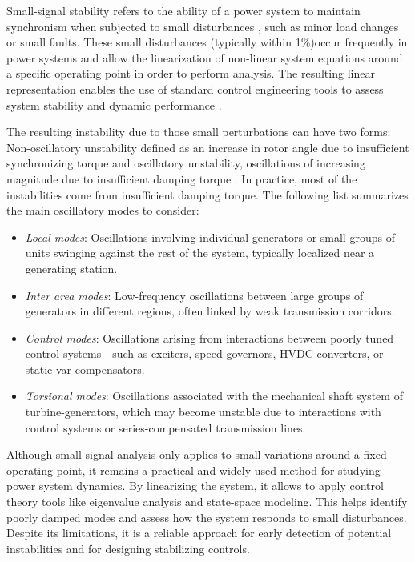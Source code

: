 Small-signal stability refers to the ability of a power system to maintain synchronism when subjected to 
small disturbances \cite{StabilityAndControlKundur}, such as minor load changes or small faults. These small disturbances
(typically within 1\%)occur frequently in power systems and allow the linearization of non-linear system equations
 around a specific operating point in order to perform analysis. The resulting linear representation enables the use
  of standard control engineering tools to assess system stability and dynamic performance \cite{SmallSignalCheah}.

The resulting instability due to those small perturbations can have two forms: Non-oscillatory unstability defined as an 
increase in rotor angle due to insufficient synchronizing torque and oscillatory unstability, oscillations of 
increasing magnitude due to insufficient damping torque \cite{StabilityAndControlKundur}. In practice, most of the 
instabilities come from insufficient damping torque. The following list summarizes the main oscillatory modes to consider:

\begin{itemize}
    \item \textit{Local modes}: Oscillations involving individual generators or small groups of units swinging 
    against the rest of the system, typically localized near a generating station.
    \item \textit{Inter area modes}: Low-frequency oscillations between large groups of generators in different 
    regions, often linked by weak transmission corridors.
    \item \textit{Control modes}: Oscillations arising from interactions between poorly tuned control systems—such 
    as exciters, speed governors, HVDC converters, or static var compensators.
    \item \textit{Torsional modes}: Oscillations associated with the mechanical shaft system of turbine-generators,
    which may become unstable due to interactions with control systems or series-compensated transmission lines.
\end{itemize}


Although small-signal analysis only applies to small variations around a fixed operating point, 
it remains a practical and widely used method for studying power system dynamics. By linearizing the system,
it allows to apply control theory tools like eigenvalue analysis and state-space modeling. 
This helps identify poorly damped modes and assess how the system responds to small disturbances. Despite its limitations,
it is a reliable approach for early detection of potential instabilities and for designing stabilizing controls.



